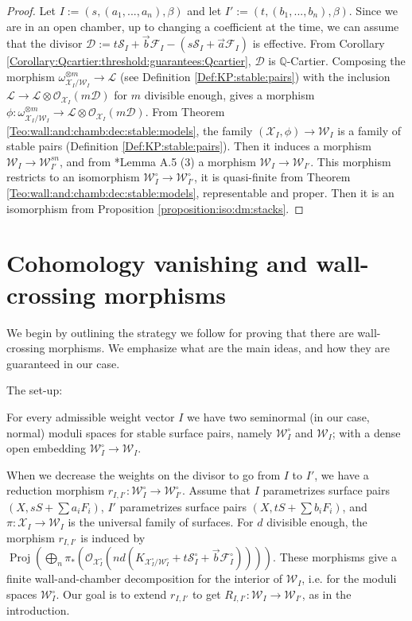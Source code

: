 \documentclass[11pt]{amsart}
\newcommand{\cE}{\mathcal{W}}
\newcommand{\sD}{\mathscr{D}}
\newcommand{\sF}{\mathscr{F}}
\newcommand{\sL}{\mathscr{L}}
\newcommand{\sS}{\mathscr{S}}
\newcommand{\sX}{\mathscr{X}}
\newcommand{\cO}{\mathcal{O}}
\theoremstyle{definition}
\begin{document}
\begin{proof}Let $I:=(s,(a_1,...,a_n),\beta)$ and let $I':=(t,(b_1,...,b_n),\beta)$. Since we are in an open chamber, up to changing a coefficient at the time, we can assume that the divisor $\sD:=t\sS_I+\vec{b}\sF_I-(s\sS_I+\vec{a}\sF_I)$ is effective. From Corollary \ref{Corollary:Qcartier:threshold:guarantees:Qcartier}, $\sD$ is $\mathbb{Q}$-Cartier. Composing the morphism $\omega_{\sX_I/\cE_I}^{\otimes m} \to \sL$ (see Definition \ref{Def:KP:stable:pairs}) with the inclusion $\sL \to \sL \otimes \cO_{\sX_I}(m\sD)$ for $m$ divisible enough, gives a morphism $\phi:\omega_{\sX_I/\cE_I}^{\otimes m} \to \sL \otimes \cO_{\sX_I}(m\sD)$. From Theorem \ref{Teo:wall:and:chamb:dec:stable:models}, the family $(\sX_I, \phi) \to \cE_I$ is a family of stable pairs (Definition \ref{Def:KP:stable:pairs}). Then it induces a morphism $\cE_I \to \cE_{I'}^{sn}$, and from \cite{AB3}*{Lemma A.5 (3)} a morphism $\cE_I \to \cE_{I'}$.
This morphism restricts to an isomorphism $\cE_I^{\circ} \to \cE_{I'}^{\circ}$, it is quasi-finite from Theorem \ref{Teo:wall:and:chamb:dec:stable:models}, representable and proper. Then it is an isomorphism from Proposition \ref{proposition:iso:dm:stacks}.
\end{proof}
\section{Cohomology vanishing and wall-crossing morphisms}\label{Section:cohom:vanishing:and:w:crossing}
We begin by outlining the strategy we follow for proving that there are wall-crossing morphisms. We emphasize what are the main ideas, and how they are guaranteed in our case.

\begin{bf}The set-up:\end{bf} For every admissible weight vector $I$ we have two seminormal (in our case, normal) moduli spaces for stable surface pairs, namely $\cE_I^\circ$ and $\cE_I$; with a dense open embedding $\cE_I^\circ \to \cE_I$. 

When we decrease the weights on the divisor to go from $I$ to $I'$, we have a reduction morphism $r_{I,I'}:\cE_I^\circ \to \cE_{I'}^\circ$. Assume that $I$ parametrizes surface pairs $(X,sS+\sum a_i F_i)$,
$I'$ parametrizes surface pairs $(X,tS+\sum b_i F_i)$, and $\pi:\sX_I \to \cE_I$ is the universal family of surfaces. For $d$ divisible enough, the morphism $r_{I,I'}$ is induced by $\operatorname{Proj}(\bigoplus_n \pi_*(\cO_{\sX^\circ_I}( nd(K_{\sX^\circ_I/\cE^\circ_I}+t\sS^\circ_I+ \vec{b}\sF^\circ_I)))).$
These morphisms give a finite wall-and-chamber decomposition for the interior of $\cE_I$, i.e. for the moduli spaces $\cE_I^\circ$.
Our goal is to extend $r_{I,I'}$ to get $R_{I,I'}:\cE_I \to \cE_{I'}$, as in the introduction.
\end{document}

